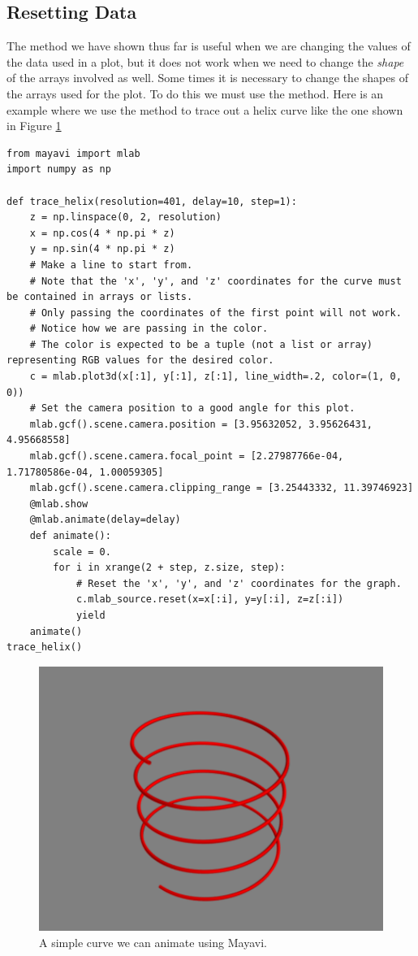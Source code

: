\subsection*{Resetting Data}
The  method we have shown thus far is useful when we are changing the values of the data used in a plot, but it does not work when we need to change the \emph{shape} of the arrays involved as well.
Some times it is necessary to change the shapes of the arrays used for the plot.
To do this we must use the  method.
Here is an example where we use the  method to trace out a helix curve like the one shown in Figure \ref{fig:helix_animation}
\begin{lstlisting}
from mayavi import mlab
import numpy as np

def trace_helix(resolution=401, delay=10, step=1):
    z = np.linspace(0, 2, resolution)
    x = np.cos(4 * np.pi * z)
    y = np.sin(4 * np.pi * z)
    # Make a line to start from.
    # Note that the 'x', 'y', and 'z' coordinates for the curve must be contained in arrays or lists.
    # Only passing the coordinates of the first point will not work.
    # Notice how we are passing in the color.
    # The color is expected to be a tuple (not a list or array) representing RGB values for the desired color.
    c = mlab.plot3d(x[:1], y[:1], z[:1], line_width=.2, color=(1, 0, 0))
    # Set the camera position to a good angle for this plot.
    mlab.gcf().scene.camera.position = [3.95632052, 3.95626431, 4.95668558]
    mlab.gcf().scene.camera.focal_point = [2.27987766e-04, 1.71780586e-04, 1.00059305]
    mlab.gcf().scene.camera.clipping_range = [3.25443332, 11.39746923]
    @mlab.show
    @mlab.animate(delay=delay)
    def animate():
        scale = 0.
        for i in xrange(2 + step, z.size, step):
            # Reset the 'x', 'y', and 'z' coordinates for the graph.
            c.mlab_source.reset(x=x[:i], y=y[:i], z=z[:i])
            yield
    animate()
trace_helix()
\end{lstlisting}

\begin{figure}
\includegraphics[width=\textwidth]{helix.pdf}
\caption{A simple curve we can animate using Mayavi.}
\label{fig:helix_animation}
\end{figure}

